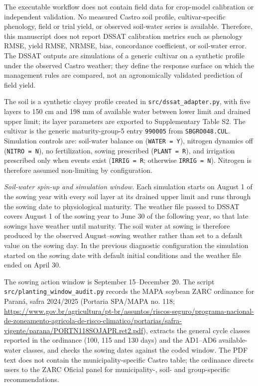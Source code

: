 \documentclass[times,final,authoryear]{elsarticle}
\begin{document}
The executable workflow does not contain field data for crop-model calibration or independent validation. No measured Castro soil profile, cultivar-specific phenology, field or trial yield, or observed soil-water series is available. Therefore, this manuscript does not report DSSAT calibration metrics such as phenology RMSE, yield RMSE, NRMSE, bias, concordance coefficient, or soil-water error. The DSSAT outputs are simulations of a generic cultivar on a synthetic profile under the observed Castro weather; they define the response surface on which the management rules are compared, not an agronomically validated prediction of field yield.

The soil is a synthetic clayey profile created in \texttt{src/dssat\_adapter.py}, with five layers to 150 cm and 198 mm of available water between lower limit and drained upper limit; its layer parameters are exported to Supplementary Table S2. The cultivar is the generic maturity-group-5 entry \texttt{990005} from \texttt{SBGRO048.CUL}. Simulation controls are: soil-water balance on (\texttt{WATER = Y}), nitrogen dynamics off (\texttt{NITRO = N}), no fertilization, sowing prescribed (\texttt{PLANT = R}), and irrigation prescribed only when events exist (\texttt{IRRIG = R}; otherwise \texttt{IRRIG = N}). Nitrogen is therefore assumed non-limiting by configuration.

\emph{Soil-water spin-up and simulation window.} Each simulation starts on August 1 of the sowing year with every soil layer at its drained upper limit and runs through the sowing date to physiological maturity. The weather file passed to DSSAT covers August 1 of the sowing year to June 30 of the following year, so that late sowings have weather until maturity. The soil water at sowing is therefore produced by the observed August--sowing weather rather than set to a default value on the sowing day. In the previous diagnostic configuration the simulation started on the sowing date with default initial conditions and the weather file ended on April 30.

The sowing action window is September 15--December 20. The script \texttt{src/planting\_window\_audit.py} records the MAPA soybean ZARC ordinance for Paraná, safra 2024/2025 (Portaria SPA/MAPA no. 118; \url{https://www.gov.br/agricultura/pt-br/assuntos/riscos-seguro/programa-nacional-de-zoneamento-agricola-de-risco-climatico/portarias/safra-vigente/parana/PORTN118SOJAPR.ret2.pdf}), extracts the general cycle classes reported in the ordinance (100, 115 and 130 days) and the AD1--AD6 available-water classes, and checks the sowing dates against the coded window. The PDF text does not contain the municipality-specific Castro table; the ordinance directs users to the ZARC Oficial panel for municipality-, soil- and group-specific recommendations.
\end{document}
